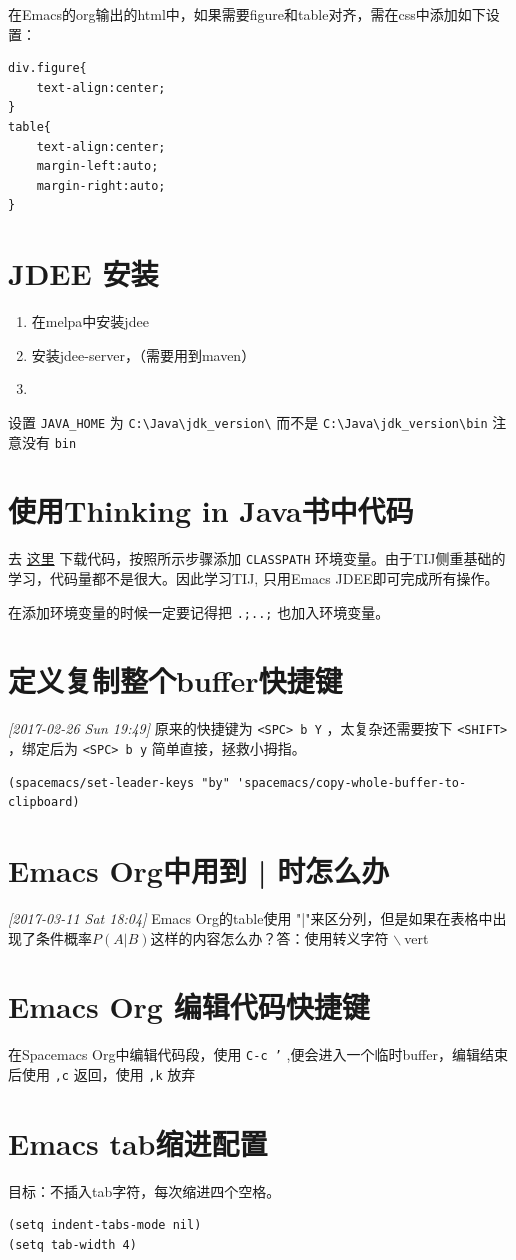 \documentclass[10pt,a4paper,UTF8]{article}
\begin{document}
在Emacs的org输出的html中，如果需要figure和table对齐，需在css中添加如下设置：
\lstset{language=css,label= ,caption= ,captionpos=b,numbers=none}
\begin{lstlisting}
div.figure{
    text-align:center;
}
table{
    text-align:center;
    margin-left:auto;
    margin-right:auto;
}
\end{lstlisting}
\section{JDEE 安装}
\label{sec:org9717c0e}


\begin{enumerate}
\item 在melpa中安装jdee
\item 安装jdee-server，（需要用到maven）
\item 
\end{enumerate}
设置 \texttt{JAVA\_HOME} 为 \texttt{C:\textbackslash{}Java\textbackslash{}jdk\_version\textbackslash{}} 而不是 \texttt{C:\textbackslash{}Java\textbackslash{}jdk\_version\textbackslash{}bin} 注意没有 \texttt{bin}
\section{使用Thinking in Java书中代码}
\label{sec:org4225876}


去 \href{http://www.mindviewinc.com/TIJ4/CodeInstructions.html}{这里} 下载代码，按照所示步骤添加 \texttt{CLASSPATH} 环境变量。由于TIJ侧重基础的学习，代码量都不是很大。因此学习TIJ, 只用Emacs JDEE即可完成所有操作。

在添加环境变量的时候一定要记得把 \texttt{.;..;} 也加入环境变量。
\section{定义复制整个buffer快捷键}
\label{sec:org7003904}
\textit{[2017-02-26 Sun 19:49]}
原来的快捷键为 \texttt{<SPC> b Y} ，太复杂还需要按下 \texttt{<SHIFT>} ，绑定后为 \texttt{<SPC> b y} 简单直接，拯救小拇指。
\lstset{language=emacs-list,label= ,caption= ,captionpos=b,numbers=none}
\begin{lstlisting}
(spacemacs/set-leader-keys "by" 'spacemacs/copy-whole-buffer-to-clipboard)
\end{lstlisting}
\section{Emacs Org中用到 | 时怎么办}
\label{sec:org7044205}
\textit{[2017-03-11 Sat 18:04] } 
Emacs Org的table使用 "|"来区分列，但是如果在表格中出现了条件概率\(P(A|B)\)这样的内容怎么办？答：使用转义字符 $\backslash$\(~\)vert
\section{Emacs Org 编辑代码快捷键}
\label{sec:org6c25f8b}


在Spacemacs Org中编辑代码段，使用 \texttt{C-c '} ,便会进入一个临时buffer，编辑结束后使用 \texttt{,c} 返回，使用 \texttt{,k} 放弃
\section{Emacs tab缩进配置}
\label{sec:org1b6dc8a}


目标：不插入tab字符，每次缩进四个空格。
\begin{verbatim}
(setq indent-tabs-mode nil)
(setq tab-width 4)
\end{verbatim}
\end{document}
